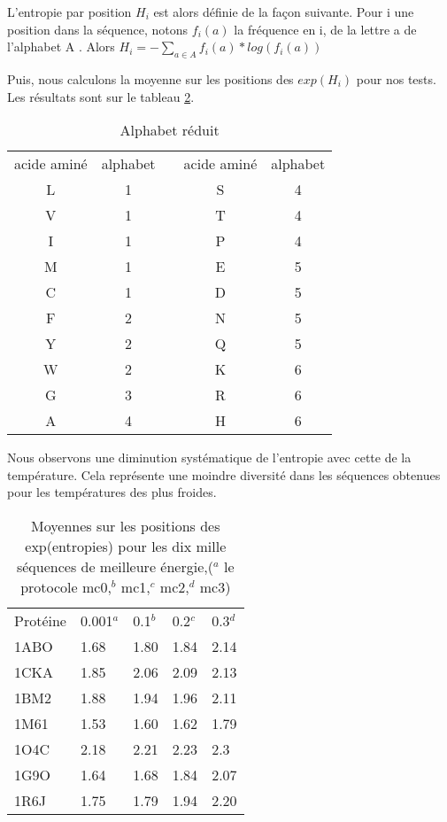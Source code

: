 L'entropie par position $H_i$ est alors définie de la façon suivante.
Pour i une position dans la séquence, notons $f_{i}(a)$ la fréquence en i, de la lettre a de l'alphabet A . Alors 
$H_i=  - \sum_{a \in A} f_{i}(a) * log( f_{i}(a) ) $  

Puis, nous calculons la moyenne sur les positions des $exp(H_i)$ pour nos tests. Les résultats sont sur le tableau \ref{tab:Entro_mc}.


    \begin{table}[!htbp]
      \centering
      
      \begin{tabular}{ccccc}
        \toprule
        acide aminé & alphabet & & acide aminé & alphabet \\
        \cmidrule(r){1-2}   \cmidrule(r){4-5}     
        L & 1 & & S & 4 \\
        V & 1 & & T & 4 \\
        I & 1 & & P & 4 \\
        M & 1 & & E & 5 \\
        C & 1 & & D & 5 \\
        F & 2 & & N & 5 \\
        Y & 2 & & Q & 5 \\
        W & 2 & & K & 6 \\
        G & 3 & & R & 6 \\
        A & 4 & & H & 6 \\
        \bottomrule                
      \end{tabular}
      \caption{Alphabet réduit}      
      \label{tab:Alphabet}

    \end{table}

Nous observons une diminution systématique de l'entropie avec cette de la température. Cela représente une moindre diversité dans les séquences obtenues pour les températures des plus froides.

    \begin{table}[!htbp]
      \centering
      
      \begin{tabular}{lllll}
        \toprule
         Protéine & 0.001$^a$ & 0.1$^b$ & 0.2$^c$  & 0.3$^d$ \\
        \cmidrule{1-5}      
        1ABO & 1.68 & 1.80 & 1.84 & 2.14  \\  
        1CKA & 1.85 & 2.06 & 2.09 & 2.13  \\ 
        1BM2 & 1.88 & 1.94 & 1.96 & 2.11  \\ 
        1M61 & 1.53 & 1.60 & 1.62 & 1.79  \\ 
        1O4C & 2.18 & 2.21 & 2.23 & 2.3   \\ 
        1G9O & 1.64 & 1.68 & 1.84 & 2.07  \\ 
        1R6J & 1.75 & 1.79 & 1.94 & 2.20  \\ 
        \bottomrule               
      \end{tabular}
      \caption{Moyennes sur les positions des exp(entropies) pour les dix mille séquences de meilleure énergie,($^a$ le protocole mc0,$^b$ mc1,$^c$  mc2,$^d$ mc3)}      
      \label{tab:Entro_mc}
    \end{table}

